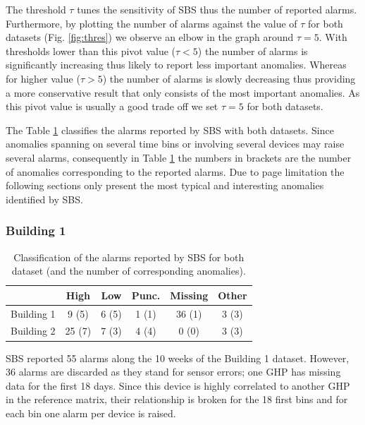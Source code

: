 The threshold $\tau$ tunes the sensitivity of SBS thus the number of reported alarms.  
Furthermore, by plotting the number of alarms against the value of $\tau$ for both datasets (Fig. \ref{fig:thres}) we observe an elbow in the graph around $\tau=5$.
With thresholds lower than this pivot value ($\tau<5$) the number of alarms is significantly increasing thus likely to report less important anomalies.
Whereas for higher value ($\tau>5$) the number of alarms is slowly decreasing thus providing a more conservative result that only consists of the most important anomalies.
As this pivot value is usually a good trade off we set $\tau=5$ for both datasets.

The Table \ref{tab:classif} classifies the alarms reported by SBS with both datasets.
Since anomalies spanning on several time bins or involving several devices may raise several alarms, consequently in Table \ref{tab:classif} the numbers in brackets are the number of anomalies corresponding to the reported alarms.
Due to page limitation the following sections only present the most typical and interesting anomalies identified by SBS.

\subsubsection{Building 1}

\begin{table}
\begin{center}
\begin{tabular}{|l||c|c|c|c|c|}
\hline
&High&Low&Punc.&Missing&Other\\ \hline \hline
Building 1& 9 (5) & 6 (5) & 1 (1) & 36 (1) & 3 (3) \\ \hline
Building 2& 25 (7) & 7 (3) & 4 (4) & 0 (0) & 3 (3) \\ \hline
\end{tabular}
\end{center}
\caption{Classification of the alarms reported by SBS for both dataset (and the number of corresponding anomalies).}
\label{tab:classif}
\end{table}

SBS reported 55 alarms along the 10 weeks of the Building 1 dataset.
However, 36 alarms are discarded as they stand for sensor errors; one GHP has missing data for the first 18 days.
Since this device is highly correlated to another GHP in the reference matrix, their relationship is broken for the 18 first bins and for each bin one alarm per device is raised.

